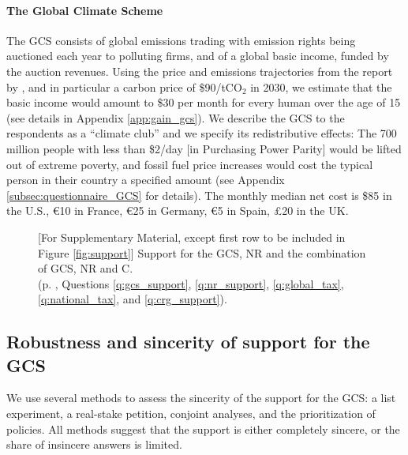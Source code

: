 \begin{tcolorbox}\label{box:GCS}
  \paragraph{The Global Climate Scheme} The GCS consists of global emissions trading with emission rights being auctioned each year to polluting firms, and of a global basic income, funded by the auction revenues. Using the price and emissions trajectories from the report by \cite{stern_report_2017}, and in particular a carbon price of \$90/tCO$_\text{2}$ in 2030, we estimate that the basic income would amount to \$30 per month for every human over the age of 15 (see details in Appendix \ref{app:gain_gcs}). %
  We describe the GCS to the respondents as a ``climate club'' and we specify its redistributive effects: The 700 million people with less than \$2/day [in Purchasing Power Parity] would be lifted out of extreme poverty, and fossil fuel price increases would cost the typical person in their country a specified amount (see Appendix \ref{subsec:questionnaire_GCS} for details). The monthly median net cost is \$85 in the U.S., \euro{}10 in France, \euro{}25 in Germany, \euro{}5 in Spain, £20 in the UK.
\end{tcolorbox}
\setcounter{figure}{0}
\renewcommand{\thefigure}{S\arabic{figure}}
\begin{figure}[h!]
    \caption[Support for the Global Climate Scheme]{[For Supplementary Material, except first row to be included in Figure \ref{fig:support}] Support for the GCS, NR and the combination of GCS, NR and C. \\(p. \pageref{subsec:questionnaire_GCS}, Questions \ref{q:gcs_support}, \ref{q:nr_support}, \ref{q:global_tax}, \ref{q:national_tax}, and \ref{q:crg_support}).%
    }\label{fig:support_binary}
\end{figure}

\subsection{Robustness and sincerity of support for the GCS}\label{subsec:robustness_sincerity}
We use several methods to assess the sincerity of the support for the GCS: a list experiment, a real-stake petition, conjoint analyses, and the prioritization of policies. All methods suggest that the support is either completely sincere, or the share of insincere answers is limited. 

